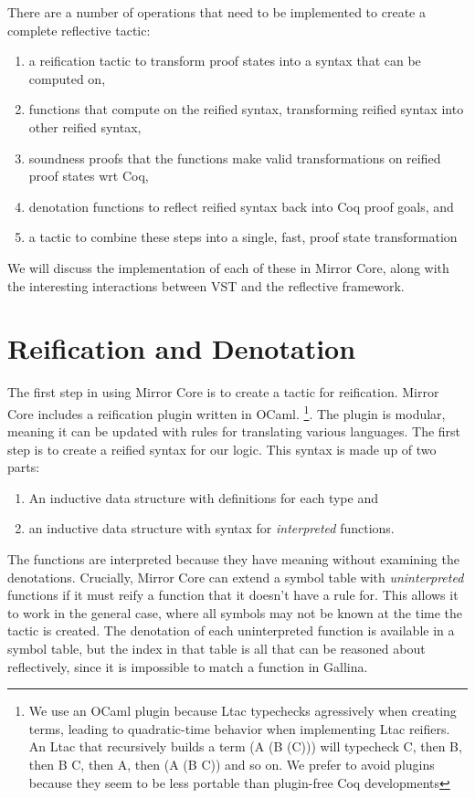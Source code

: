 \documentclass{puthesis}
\begin{document}
There are a number of operations that need to be implemented to create
a complete reflective tactic: 
\begin{enumerate}
\item a reification tactic to transform proof states into a
  syntax that can be computed on,
\item functions that compute on the reified syntax, transforming
  reified syntax into other reified syntax,
\item soundness proofs that the functions make valid transformations
  on reified proof states wrt Coq,
\item denotation functions to reflect reified syntax back into Coq
  proof goals, and
\item a tactic to combine these steps into a single, fast, proof state
  transformation
\end{enumerate}

We will discuss the implementation of each of these in Mirror Core,
along with the interesting interactions between VST and
the reflective framework.

\section{Reification and Denotation}
\label{sec:reification}
The first step in using Mirror Core is to create a tactic for
reification. Mirror Core includes a reification plugin written in
OCaml. \footnote{We use an OCaml plugin because Ltac typechecks
  agressively when creating terms, leading to quadratic-time behavior
  when implementing Ltac reifiers. An Ltac that recursively builds a
  term (A (B (C))) will typecheck C, then B, then B C, then A, then (A
  (B C)) and so on.  We prefer to avoid plugins because they seem to
  be less portable than plugin-free Coq developments}.  The plugin is
modular, meaning it can be updated with rules for translating various
languages. The first step is to create a reified syntax for our
logic. This syntax is made up of two parts:

\begin{enumerate}
\item An inductive data structure with definitions for each type and
\item an inductive data structure with syntax for \emph{interpreted}
  functions.
\end{enumerate}

The functions are interpreted because they have meaning without
examining the denotations. Crucially, Mirror Core can extend a
symbol table with \emph{uninterpreted} functions if it must reify a
function that it doesn't have a rule for. This allows it to work in
the general case, where all symbols may not be known at the time the
tactic is created. The denotation of each uninterpreted function is available in a
symbol table, but the index in that table is all that can be reasoned
about reflectively, since it is impossible to match a function in
Gallina. 
\end{document}
